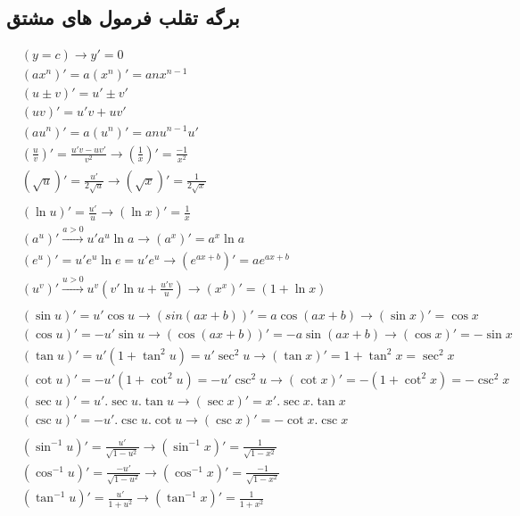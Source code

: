 \newpage
\subsection{برگه تقلب فرمول های مشتق}
\begin{align*}
&(y = c) \longrightarrow y' = 0 \\
&(ax^n)' = a(x^n)' = anx^{n-1} \\
&(u \pm v)' = u' \pm v' \\
&(uv)' = u'v + uv' \\
&(au^n)' = a(u^n)' = anu^{n-1}u' \\
&(\frac{u}{v})' = \frac{u'v - uv'}{v^2} \longrightarrow (\frac{1}{x})' = \frac{-1}{x^2} \\
&(\sqrt{u})' = \frac{u'}{2\sqrt{u}} \longrightarrow (\sqrt{x})' = \frac{1}{2\sqrt{x}} \\
\\
&(\ln u)' = \frac{u'}{u} \longrightarrow (\ln x)' = \frac{1}{x}  \\
&(a^u)' \overset{a>0}{\longrightarrow} u'a^u\ln a \longrightarrow (a^x)' = a^x\ln a \\
&(e^u)' = u'e^u\ln e = u'e^u \longrightarrow (e^{ax+b})' = ae^{ax+b} \\
&(u^v)' \overset{u>0}{\longrightarrow} u^v(v'\ln u+\frac{u'v}{u}) \longrightarrow (x^x)' = (1 + \ln x) \\
\\
&(\sin u)' = u'\cos u \longrightarrow (sin(ax+b))' = a\cos(ax+b) \longrightarrow (\sin x)' = \cos x \\
&(\cos u)' = -u'\sin u \longrightarrow (\cos(ax+b))' = -a\sin(ax+b) \to (\cos x)' = -\sin x \\
&(\tan u)' = u'(1+\tan^2u) = u'\sec^2u \longrightarrow (\tan x)' = 1+\tan^2 x = \sec^2 x \\
&(\cot u)' = -u'(1+\cot^2u) = -u'\csc^2u \longrightarrow (\cot x)' = -(1+\cot^2x) = -\csc^2x \\
&(\sec u)' = u'.\sec u.\tan u \longrightarrow (\sec x)' = x'.\sec x.\tan x \\
&(\csc u)' = -u'.\csc u.\cot u \longrightarrow (\csc x)' = -\cot x.\csc x \\
\\
&(\sin^{-1} u)' = \frac{u'}{\sqrt{1-u^2}} \longrightarrow (\sin^{-1}x)' = \frac{1}{\sqrt{1-x^2}} \\
&(\cos^{-1} u)' = \frac{-u'}{\sqrt{1-u^2}} \longrightarrow (\cos^{-1}x)' = \frac{-1}{\sqrt{1-x^2}} \\
&(\tan^{-1} u)' = \frac{u'}{1+u^2} \longrightarrow (\tan^{-1}x)' = \frac{1}{1+x^2} \\

\end{align*}
